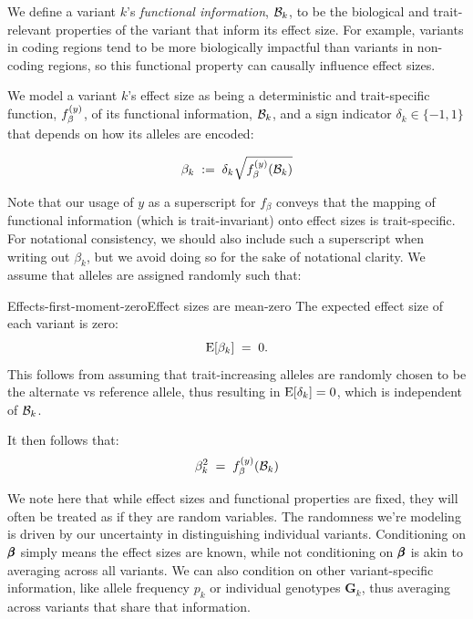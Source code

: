 \documentclass[12pt]{article}
\numberwithin{equation}{section}
\begin{document}
We define a variant $k$'s \emph{functional information}, $\mathcal{B}_k$, to be the biological and trait-relevant properties of the variant that inform its effect size.
For example, variants in coding regions tend to be more biologically impactful than variants in non-coding regions, so this functional property can causally influence effect sizes.

We model a variant $k$'s effect size as being a deterministic and trait-specific function, $f_\beta^{(y)}$, of its functional information, $\mathcal{B}_k$, and a sign indicator $\delta_k \in \{-1, 1\}$ that depends on how its alleles are encoded:

\begin{equation}\label{eq:effect-size-function}
    \beta_k \;:=\; \delta_k \sqrt{f_\beta^{(y)}(\mathcal{B}_k)}
\end{equation}

Note that our usage of $y$ as a superscript for $f_\beta$ conveys that the mapping of functional information (which is trait-invariant) onto effect sizes is trait-specific.
For notational consistency, we should also include such a superscript when writing out $\beta_k$, but we avoid doing so for the sake of notational clarity.
We assume that alleles are assigned randomly such that:

\begin{assumption}{Effects-first-moment-zero}{Effect sizes are mean-zero}
The expected effect size of each variant is zero:
$$ \mathrm{E}[\beta_k] \;=\; 0 . $$
This follows from assuming that trait-increasing alleles are randomly chosen to be the alternate vs reference allele, thus resulting in $\mathrm{E}[\delta_k]=0$, which is independent of $\mathcal{B}_k$.
\end{assumption}

It then follows that:
$$ \beta^2_k \;=\; f_\beta^{(y)}(\mathcal{B}_k) $$

We note here that while effect sizes and functional properties are fixed, they will often be treated as if they are random variables.
The randomness we're modeling is driven by our uncertainty in distinguishing individual variants.
Conditioning on $\pmb{\beta}$ simply means the effect sizes are known, while not conditioning on $\pmb{\beta}$ is akin to averaging across all variants.
We can also condition on other variant-specific information, like allele frequency $p_k$ or individual genotypes $\mathbf{G}_{k}$, thus averaging across variants that share that information.
\end{document}
